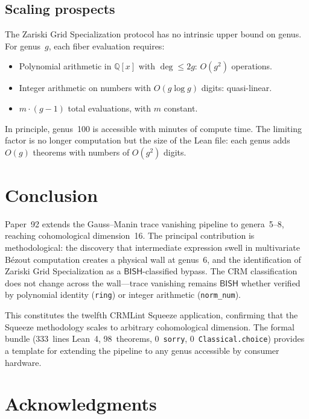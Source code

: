 \documentclass[11pt]{article}
\theoremstyle{plain}
\theoremstyle{definition}
\theoremstyle{remark}
\newcommand{\QQ}{\mathbb{Q}}
\newcommand{\BISH}{\mathsf{BISH}}
\begin{document}
\subsection{Scaling prospects}

The Zariski Grid Specialization protocol has no intrinsic upper bound on
genus.  For genus~$g$, each fiber evaluation requires:
\begin{itemize}[nosep]
  \item Polynomial arithmetic in $\QQ[x]$ with $\deg \leq 2g$:
    $O(g^2)$ operations.
  \item Integer arithmetic on numbers with $O(g \log g)$ digits:
    quasi-linear.
  \item $m \cdot (g-1)$ total evaluations, with $m$ constant.
\end{itemize}
In principle, genus~100 is accessible with minutes of compute time.
The limiting factor is no longer computation but the size of the Lean
file: each genus adds $O(g)$ theorems with numbers of $O(g^2)$ digits.

\section{Conclusion}
\label{sec:conclusion}

Paper~92 extends the Gauss--Manin trace vanishing pipeline to genera~5--8,
reaching cohomological dimension~16.  The principal contribution is
methodological: the discovery that intermediate expression swell in
multivariate B\'ezout computation creates a physical wall at genus~6,
and the identification of Zariski Grid Specialization as a $\BISH$-classified
bypass.  The CRM classification does not change across the wall---trace
vanishing remains $\BISH$ whether verified by polynomial identity
(\texttt{ring}) or integer arithmetic (\texttt{norm\_num}).

This constitutes the twelfth CRMLint Squeeze application, confirming
that the Squeeze methodology scales to arbitrary cohomological dimension.
The formal bundle (333~lines Lean~4, 98~theorems, 0~\texttt{sorry},
0~\texttt{Classical.choice}) provides a template for extending the
pipeline to any genus accessible by consumer hardware.

\section*{Acknowledgments}
\end{document}
